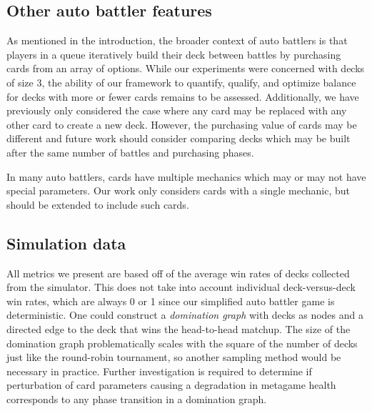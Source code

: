 
\subsection{Other auto battler features}


As mentioned in the introduction, the broader context of auto battlers is that
players in a queue iteratively build their deck between battles by purchasing
cards from an array of options. While our experiments were concerned with decks of size 3, 
the ability of our framework to quantify, qualify, and optimize balance for decks with 
more or fewer cards remains to be assessed. Additionally, we have previously only considered
the case where any card may be replaced with any other card to create a new deck. However, 
the purchasing value of cards may be different and future work should consider comparing decks
which may be built after the same number of battles and purchasing phases.


In many auto battlers, cards have multiple mechanics which may or may not have special parameters.
Our work only considers cards with a single mechanic, but should be extended to include such cards.


\subsection{Simulation data}

All metrics we present are based off of the average win rates of decks collected from the simulator. 
This does not take into account individual deck-versus-deck win rates, which are always 0 or 1 since
our simplified auto battler game is deterministic. One could construct a \textit{domination graph} with decks
as nodes and a directed edge to the deck that wins the head-to-head matchup. The size of the domination
graph problematically scales with the square of the number of decks just like the round-robin tournament,
so another sampling method would be necessary in practice. Further investigation is required to determine if perturbation of card parameters causing a degradation
in metagame health corresponds to any phase transition in a domination graph.

